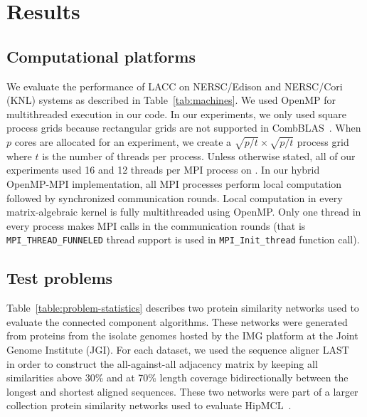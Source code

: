 \section{Results}
\label{sec:results}

\subsection{Computational platforms} 
We evaluate the performance of LACC on NERSC/Edison and NERSC/Cori (KNL) systems  as described in Table~\ref{tab:machines}.
We used OpenMP for multithreaded execution in our code. 
In our experiments, we only used square process grids because rectangular grids are not supported in CombBLAS~\cite{bulucc2011combinatorial}. 
When $p$ cores are allocated for an experiment, we create a $\sqrt{p/t} \times \sqrt{p/t} $ process grid where $t$ is the number of threads per process.
Unless otherwise stated, all of our experiments used 16 and 12 threads per MPI process on .
In our hybrid OpenMP-MPI implementation, all MPI processes perform local computation followed by synchronized communication rounds. 
Local computation in every matrix-algebraic kernel is fully multithreaded using OpenMP.
Only one thread in every process makes MPI calls in the communication rounds (that is \texttt{MPI\_THREAD\_FUNNELED} thread support is used in \texttt{MPI\_Init\_thread} function call).

\subsection{Test problems} 
Table~\ref{table:problem-statistics} describes two protein similarity networks used to evaluate the connected component algorithms.
These networks were generated from proteins from the isolate genomes hosted
by the IMG platform at the Joint Genome Institute (JGI). For each dataset, we used the sequence aligner LAST~\cite{kielbasa2011adaptive} in order to construct the all-against-all adjacency matrix
by keeping all similarities above 30\% and at 70\% length coverage bidirectionally between the longest and shortest aligned sequences. 
These two networks were part of a larger collection protein similarity networks  used to evaluate HipMCL~\cite{hipmcl}. 


